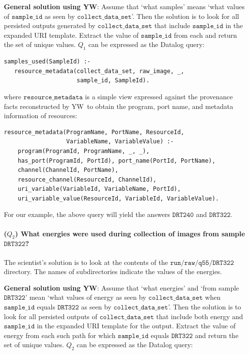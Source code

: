 \documentclass[nocopyrightspace]{sigplanconf}
\newcommand{\code}[1]{\ensuremath{\mathtt{#1}}}
\newcommand{\yw}{\textsf{YW}}
\begin{document}
\textbf{General solution using \yw}: Assume that `what samples' means
`what values of \code{sample\_id} as seen by
\code{collect\_data\_set}'. Then the solution is to look for all
persisted outputs generated by \code{collect\_data\_set} that include
\code{sample\_id} in the expanded URI template.  Extract the value of
\code{sample\_id} from each and return the set of unique values. $Q_1$
can be expressed as the Datalog query:
\begin{scriptsize}
\begin{verbatim}
samples_used(SampleId) :- 
   resource_metadata(collect_data_set, raw_image, _, 
                     sample_id, SampleId).
\end{verbatim}
\end{scriptsize}
where \code{resource\_metadata} is a simple view expressed against the
provenance facts reconstructed by \yw\ to obtain the program, port
name, and metadata information of resources:
\begin{scriptsize}
\begin{verbatim}
resource_metadata(ProgramName, PortName, ResourceId, 
                  VariableName, VariableValue) :-
    program(ProgramId, ProgramName, _, _), 
    has_port(ProgramId, PortId), port_name(PortId, PortName), 
    channel(ChannelId, PortName),
    resource_channel(ResourceId, ChannelId), 
    uri_variable(VariableId, VariableName, PortId), 
    uri_variable_value(ResourceId, VariableId, VariableValue). 
\end{verbatim}
\end{scriptsize}
For our example, the above query will yield the answers \code{DRT240}
and \code{DRT322}.


\paragraph{($Q_2$) What energies were used during collection of
  images from sample \code{DRT322}?}
The scientist's solution is to look at the contents of the
\code{run/raw/q55/DRT322} directory. The names of subdirectories indicate
the values of the energies.

\textbf{General solution using \yw}: Assume that `what energies' and
`from sample \code{DRT322}' mean `what values of energy as seen by
\code{collect\_data\_set} when \code{sample\_id} equals \code{DRT322}
as seen by \code{collect\_data\_set}'.  Then the solution is to look
for all persisted outputs of \code{collect\_data\_set} that include
both energy and \code{sample\_id} in the expanded URI template for the
output.  Extract the value of energy from each such path for which
\code{sample\_id} equals \code{DRT322} and return the set of unique
values. $Q_2$ can be expressed as the Datalog query: 
\end{document}
